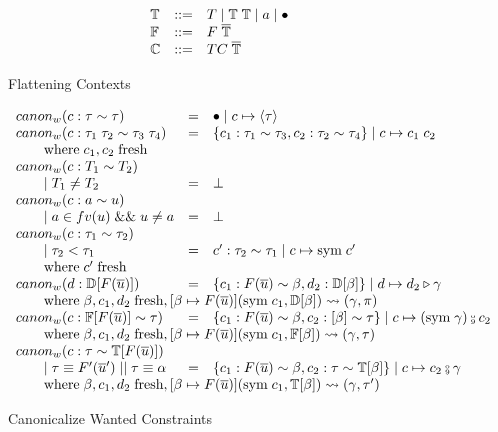 
\begin{figure}
\[
\begin{array}{l c l}
\mathbb{T} &::=& T \mid \mathbb{T} \; \mathbb{T} \mid a \mid \bullet\\
\mathbb{F} &::=& F \; \overline{\mathbb{T}}\\
\mathbb{C} &::=& TC \; \overline{\mathbb{T}}
\end{array}
\]
\caption{Flattening Contexts}
\label{fig:flattening-contexts}
\end{figure}

\begin{figure}
\small
{}
\[
\begin{array}{l c l}
canon_w(c : \tau \sim \tau) &=& \bullet \mid c \mapsto \langle \tau \rangle
\\
canon_w(c : \tau_1 \; \tau_2 \sim \tau_3 \; \tau_4) &=& \{c_1 : \tau_1 \sim
\tau_3, c_2 : \tau_2  \sim \tau_4\} \mid c \mapsto c_1 \; c_2
\\ \where c_1, c_2 \; \text{fresh}
\\
canon_w(c : T_1 \sim T_2)
\\ \guard T_1 \neq T_2 &=& \bot
\\
canon_w(c : a \sim u)
\\ \guard a \in fv(u) \; \&\& \; u \neq a &=& \bot
\\
canon_w(c : \tau_1 \sim \tau_2)
\\ \qquad \mid \tau_2 < \tau_1 &=& c' : \tau_2 \sim \tau_1 \mid c \mapsto \text{sym}
\; c'
\\ \where c' \; \text{fresh}
\\
canon_w(d : \mathbb{D}[F(\overline{u})]) &=& \{ c_1 : F(\overline{u}) \sim \beta,
d_2 : \mathbb{D}[\beta]\} \mid d \mapsto d_2 \triangleright \gamma
\\ \multicolumn{3}{l}{\where \beta, c_1, d_2 \; \text{fresh}, [\beta \mapsto
F(\overline{u})](\text{sym} \; c_1, \mathbb{D}[\beta]) \rightsquigarrow (\gamma,
\pi)}
\\
canon_w(c : \mathbb{F}[F(\overline{u})] \sim \tau) &=& \{c_1 : F(\overline{u})
\sim \beta, c_2 : \mathbb[\beta] \sim \tau \} \mid c \mapsto (\text{sym} \; \gamma)
\fctrans c_2
\\ \multicolumn{3}{l}{\where \beta, c_1, d_2 \; \text{fresh},
[\beta \mapsto F(\overline{u})](\text{sym} \;
c_1, \mathbb{F}[\beta]) \rightsquigarrow (\gamma, \tau)}
\\
canon_w(c : \tau \sim \mathbb{T}[F(\overline{u})])
\\ \qquad \mid \tau \equiv F'(\overline{u}') \; || \; \tau \equiv \alpha &=&
\{c_1 : F(\overline{u}) \sim \beta, c_2 : \tau \sim \mathbb{T}[\beta]\} \mid c
\mapsto c_2 \fctrans \gamma
\\ \multicolumn{3}{l}{\where \beta, c_1, d_2 \; \text{fresh},
[\beta \mapsto F(\overline{u})](\text{sym} \;
c_1, \mathbb{T}[\beta]) \rightsquigarrow (\gamma, \tau')}
\end{array}
\]
\caption{Canonicalize Wanted Constraints}
\label{fig:canon_w}
\end{figure}

